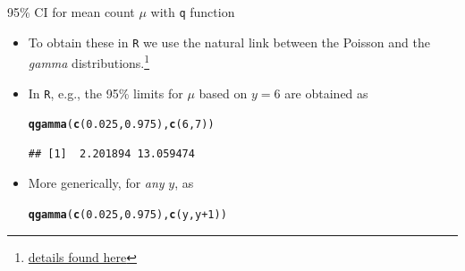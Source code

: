 \documentclass{beamer}\usepackage[]{graphicx}\usepackage[]{color}
\newcommand{\hlnum}[1]{\textcolor[rgb]{0.686,0.059,0.569}{#1}}%
\newcommand{\hlopt}[1]{\textcolor[rgb]{0,0,0}{#1}}%
\newcommand{\hlstd}[1]{\textcolor[rgb]{0.345,0.345,0.345}{#1}}%
\newcommand{\hlkwd}[1]{\textcolor[rgb]{0.737,0.353,0.396}{\textbf{#1}}}%
\newenvironment{knitrout}{}{} %
\begin{document}
\begin{frame}[fragile]{95\% CI for mean count $\mu$ with \texttt{q} function}
\begin{itemize}
	\setlength\itemsep{1em}
	\item To obtain these in \texttt{R}	we use the  natural link between the Poisson and  the \textit{gamma} 
	distributions.\footnote{
		{ \tiny \href{http://www.epi.mcgill.ca/hanley/bios601/Mean-Quantile/forAccromathBackTranslate.pdf}{details found here} }} 
	\item In \texttt{R}, e.g., the 95\% limits for $\mu$ based on $y=6$ are obtained as 
	
\begin{knitrout}\scriptsize
{}\color{fgcolor}
\begin{alltt}
\hlkwd{qgamma}\hlstd{(}\hlkwd{c}\hlstd{(}\hlnum{0.025}\hlstd{,}\hlnum{0.975}\hlstd{),} \hlkwd{c}\hlstd{(}\hlnum{6}\hlstd{,} \hlnum{7}\hlstd{))}
\end{alltt}
\begin{verbatim}
## [1]  2.201894 13.059474
\end{verbatim}

\end{knitrout}
		
	\item More generically, for \textit{any} $y$, as

\begin{knitrout}\scriptsize
{}\color{fgcolor}
\begin{alltt}
\hlkwd{qgamma}\hlstd{(}\hlkwd{c}\hlstd{(}\hlnum{0.025}\hlstd{,}\hlnum{0.975}\hlstd{),} \hlkwd{c}\hlstd{(y, y}\hlopt{+}\hlnum{1}\hlstd{))}
\end{alltt}

\end{knitrout}
		
\end{itemize}
\end{frame}
\end{document}
